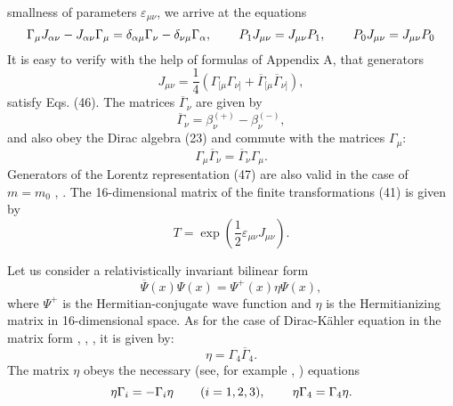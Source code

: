 \documentclass[a4paper,12pt]{article}
\begin{document}
smallness of parameters $\varepsilon _{\mu \nu }$, we arrive at
the equations
\begin{equation}
\Gamma _\mu J_{\alpha \nu }-J_{\alpha \nu }\Gamma _\mu =\delta
_{\alpha \mu }\Gamma _\nu -\delta _{\nu \mu }\Gamma _\alpha
,\hspace{0.3in} P_1 J_{\mu\nu}=J_{\mu\nu}P_1 , \hspace{0.3in}P_0
J_{\mu\nu}=J_{\mu\nu}P_0 \label{46}
\end{equation}
It is easy to verify with the help of formulas of Appendix A, that
generators
\begin{equation}
J_{\mu \nu }=\frac 14\left( \Gamma _{[\mu} \Gamma _{\nu ]}
+\overline{\Gamma }_{[\mu} \overline{\Gamma }_{\nu ]}\right) ,
\label{47}
\end{equation}
satisfy Eqs. (46). The matrices $\overline{\Gamma }_\nu $ are
given by \cite{Borgardt}
\begin{equation}
\overline{\Gamma} _\nu =\beta _\nu ^{(+)}-\beta _\nu ^{(-)} ,
  \label{48}
\end{equation}
and also obey the Dirac algebra (23) and commute with the matrices
$\Gamma _\mu $:
\[
\Gamma _\mu \overline{\Gamma }_\nu=\overline{\Gamma }_\nu \Gamma
_\mu .
\]
Generators of the Lorentz representation (47) are also
valid in the case of $m=m_0$ \cite{Kruglov1}, \cite{monogr}. The
16-dimensional matrix of the finite transformations (41) is given
by
\begin{equation}
T=\exp \left( \frac 12\varepsilon _{\mu \nu }J_{\mu \nu }\right) .
\label{49}
\end{equation}

Let us consider a relativistically invariant bilinear form
\begin{equation}
\overline{\Psi }(x)\Psi (x)=\Psi ^{+}(x)\eta \Psi (x) , \label{50}
\end{equation}
where $\Psi ^{+}$ is the Hermitian-conjugate wave function and
$\eta$ is the Hermitianizing matrix in 16-dimensional space. As
for the case of Dirac-K\"{a}hler equation in the matrix form
\cite{Borgardt}, \cite{Kruglov1}, \cite{monogr}, it is given by:
\begin{equation}
\eta =\Gamma _4\overline{\Gamma }_4 . \label{51}
\end{equation}
The matrix $\eta$ obeys the necessary (see, for example
\cite{Bogush}, \cite{Fedorov}) equations
\[
\eta \Gamma _i=-\Gamma _i\eta \hspace{0.3in}(i=1,2,3) ,
\hspace{0.3in}\eta \Gamma _4=\Gamma _4\eta .
\]
\end{document}
